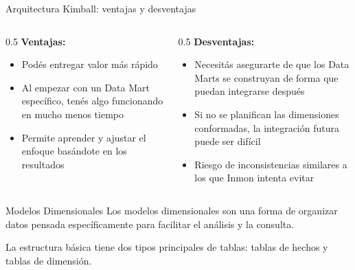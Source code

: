 \documentclass{beamer}
\begin{document}
\begin{frame}{Arquitectura Kimball: ventajas y desventajas}
    \begin{columns}
        \begin{column}{0.5\textwidth}
            \textbf{Ventajas:}
            \begin{itemize}
                \item Podés entregar valor más rápido
                \item Al empezar con un Data Mart específico, tenés algo funcionando en mucho menos tiempo
                \item Permite aprender y ajustar el enfoque basándote en los resultados
            \end{itemize}
        \end{column}
        \begin{column}{0.5\textwidth}
            \textbf{Desventajas:}
            \begin{itemize}
                \item Necesitás  asegurarte de que los Data Marts se construyan de forma que puedan integrarse después
                \item Si no se planifican las dimensiones conformadas, la integración futura puede ser difícil
                \item Riesgo de inconsistencias similares a los que Inmon intenta evitar
            \end{itemize}
        \end{column}
    \end{columns}
\end{frame}

\begin{frame}{Modelos Dimensionales}
    Los modelos dimensionales son una forma de organizar datos pensada específicamente para facilitar el análisis y la consulta.
    
    \vspace{0.3cm}
    
    La estructura básica tiene dos tipos principales de tablas: tablas de hechos y tablas de dimensión.
\end{frame}
\end{document}
